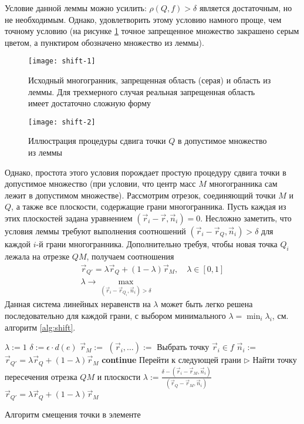 Условие данной леммы можно усилить: $\rho(Q, f) > \delta$ является достаточным, но не необходимым. 
Однако, удовлетворить этому условию намного проще, чем точному условию (на рисунке
\ref{fig:forb} точное запрещенное множество закрашено серым цветом, а пунктиром обозначено множество из леммы).
\begin{figure}[ht!]
\centering
\texttt{[image: shift-1]}%
\caption{Исходный многогранник, запрещенная область (серая) и область из леммы. Для трехмерного 
случая реальная запрещенная область имеет достаточно сложную форму}
\label{fig:forb}
\end{figure}

\begin{figure}[ht!]
\centering
\texttt{[image: shift-2]}%
\caption{Иллюстрация процедуры сдвига точки $Q$ в допустимое множество из леммы}
\end{figure}
Однако, простота этого условия порождает простую процедуру сдвига точки в допустимое множество (при 
условии, что центр масс $M$ многогранника сам лежит в допустимом множестве). Рассмотрим отрезок, 
соединяющий точки $M$ и $Q$, а также все плоскости, содержащие грани многогранника. Пусть каждая из 
этих плоскостей задана уравнением $(\vec r_i - \vec r, \vec n_i) = 0$. Несложно заметить, что 
условия леммы требуют выполнения соотношений $(\vec r_i - \vec r_Q, \vec n_i) > \delta$ для каждой 
$i$-й грани многогранника. Дополнительно требуя, чтобы новая точка $Q_i$ лежала на отрезке $QM$, 
получаем соотношения
\begin{gather*}
\vec r_{Q'} = \lambda \vec r_{Q} + (1 - \lambda) \vec r_{M}, \quad \lambda \in [0,1]\\
\lambda \rightarrow \max_{(\vec r_i - \vec r_{Q_i}, \vec n_i) > \delta}
\end{gather*}
Данная система линейных неравенств на $\lambda$ может быть легко решена последовательно для каждой грани, с выбором минимального $\lambda = \min_i \lambda_i$, см. алгоритм \ref{alg:shift}.

\begin{algorithm}[ht!]
\centering
\begin{algorithmic}[1]
\State $\lambda := 1$
\State $\delta := \epsilon \cdot d(e)$
\State $\vec r_M := $ 
\State $(\vec r_i, \dots) := $ 
\Comment Выбрать точку $\vec r_i \in f$
\State $\vec n_i := $ 
\State $\vec r_{Q'} = \lambda \vec r_Q + (1 - \lambda) \vec r_{M}$
\State \textbf{continue} \Comment Перейти к следующей грани
\Else
\State $\triangleright$ Найти точку пересечения отрезка $QM$ и плоскости
\State $\lambda := \frac{\delta - (\vec r_i - \vec r_M, \vec n_i)}
{(\vec r_Q - \vec r_M, \vec n_i)}$
\EndIf
\EndFor
\State $\vec r_{Q'} = \lambda \vec r_Q + (1 - \lambda) \vec r_{M}$
\State{}
\EndFunction
\end{algorithmic}
\caption{Алгоритм смещения точки в элементе}
\label{alg:shift}
\end{algorithm}

